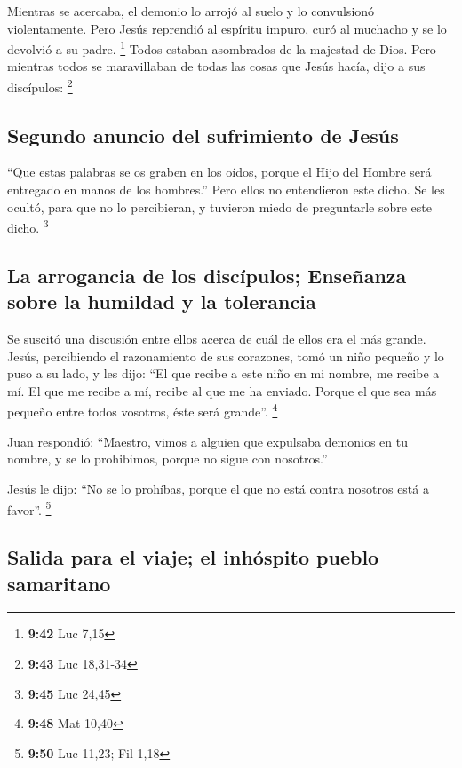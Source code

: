  Mientras se acercaba, el demonio lo arrojó al suelo y lo
convulsionó violentamente. Pero Jesús reprendió al espíritu impuro, curó
al muchacho y se lo devolvió a su padre. \footnote{\textbf{9:42} Luc
  7,15}  Todos estaban asombrados de la majestad de Dios.
Pero mientras todos se maravillaban de todas las cosas que Jesús hacía,
dijo a sus discípulos: \footnote{\textbf{9:43} Luc 18,31-34}

\hypertarget{segundo-anuncio-del-sufrimiento-de-jesuxfas}{%
\subsection{Segundo anuncio del sufrimiento de
Jesús}\label{segundo-anuncio-del-sufrimiento-de-jesuxfas}}

 ``Que estas palabras se os graben en los oídos, porque
el Hijo del Hombre será entregado en manos de los hombres.''
 Pero ellos no entendieron este dicho. Se les ocultó,
para que no lo percibieran, y tuvieron miedo de preguntarle sobre este
dicho. \footnote{\textbf{9:45} Luc 24,45}

\hypertarget{la-arrogancia-de-los-discuxedpulos-enseuxf1anza-sobre-la-humildad-y-la-tolerancia}{%
\subsection{La arrogancia de los discípulos; Enseñanza sobre la humildad
y la
tolerancia}\label{la-arrogancia-de-los-discuxedpulos-enseuxf1anza-sobre-la-humildad-y-la-tolerancia}}

 Se suscitó una discusión entre ellos acerca de cuál de
ellos era el más grande.  Jesús, percibiendo el
razonamiento de sus corazones, tomó un niño pequeño y lo puso a su lado,
 y les dijo: ``El que recibe a este niño en mi nombre, me
recibe a mí. El que me recibe a mí, recibe al que me ha enviado. Porque
el que sea más pequeño entre todos vosotros, éste será grande''.
\footnote{\textbf{9:48} Mat 10,40}

 Juan respondió: ``Maestro, vimos a alguien que expulsaba
demonios en tu nombre, y se lo prohibimos, porque no sigue con
nosotros.''

 Jesús le dijo: ``No se lo prohíbas, porque el que no
está contra nosotros está a favor''. \footnote{\textbf{9:50} Luc 11,23;
  Fil 1,18}

\hypertarget{salida-para-el-viaje-el-inhuxf3spito-pueblo-samaritano}{%
\subsection{Salida para el viaje; el inhóspito pueblo
samaritano}\label{salida-para-el-viaje-el-inhuxf3spito-pueblo-samaritano}}

